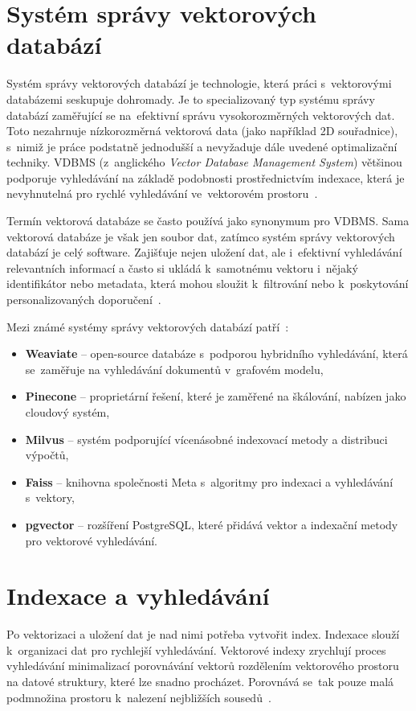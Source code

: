 \section{Systém správy vektorových databází}
Systém správy vektorových databází je technologie, která práci s~vektorovými databázemi seskupuje dohromady. Je to specializovaný typ systému správy databází zaměřující se na~efektivní správu vysokorozměrných vektorových dat. Toto nezahrnuje nízkorozměrná vektorová data (jako například 2D souřadnice), s~nimiž je práce podstatně jednodušší a nevyžaduje dále uvedené optimalizační techniky. VDBMS (z~anglického \textit{Vector Database Management System}) většinou podporuje vyhledávání na základě podobnosti prostřednictvím indexace, která je nevyhnutelná pro rychlé vyhledávání ve~vektorovém prostoru~\cite{Taipalus_2024}.

Termín vektorová databáze se často používá jako synonymum pro VDBMS. Sama vektorová databáze je však jen soubor dat, zatímco systém správy vektorových databází je celý software. Zajišťuje nejen uložení dat, ale i~efektivní vyhledávání relevantních informací a často si ukládá k~samotnému vektoru i~nějaký identifikátor nebo metadata, která mohou sloužit k~filtrování nebo k~poskytování personalizovaných doporučení~\cite{Taipalus_2024}.

Mezi známé systémy správy vektorových databází patří~\cite{pan2024_vector_dbms}:
\begin{itemize}
    \item \textbf{Weaviate} – open-source databáze s~podporou hybridního vyhledávání, která se~zaměřuje na vyhledávání dokumentů v~grafovém modelu,
    \item \textbf{Pinecone} – proprietární řešení, které je zaměřené na škálování, nabízen jako cloudový systém,
    \item \textbf{Milvus} – systém podporující vícenásobné indexovací metody a distribuci výpočtů,
    \item \textbf{Faiss} – knihovna společnosti Meta s~algoritmy pro indexaci a vyhledávání s~vektory,
    \item \textbf{pgvector} – rozšíření PostgreSQL, které přidává vektor a indexační metody pro vektorové vyhledávání.
\end{itemize}


\section{Indexace a vyhledávání}
\label{index}
Po vektorizaci a uložení dat je nad nimi potřeba vytvořit index. Indexace slouží k~organizaci dat pro rychlejší vyhledávání. Vektorové indexy zrychlují proces vyhledávání minimalizací porovnávání vektorů rozdělením vektorového prostoru na datové struktury, které lze snadno procházet. Porovnává se~tak pouze malá podmnožina prostoru k~nalezení nejbližších sousedů~\cite{pan2024_vector_dbms}.

